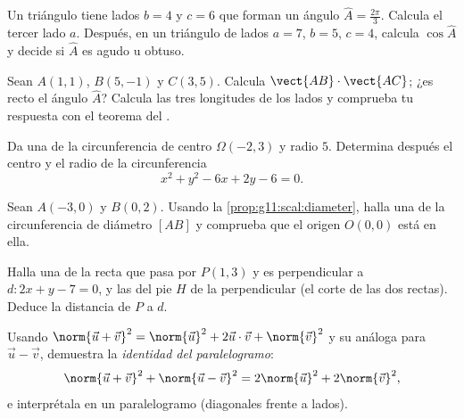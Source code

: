 \begin{exercise}[$\star\star$]\label{exo:g11:scal:5}
Un triángulo tiene lados $b = 4$ y $c = 6$ que forman un ángulo
$\widehat A = \frac{2\pi}{3}$. Calcula el tercer lado $a$. Después, en un
triángulo de lados $a = 7$, $b = 5$, $c = 4$, calcula $\cos\widehat A$ y
decide si $\widehat A$ es agudo u obtuso.
\end{exercise}

\begin{exercise}[$\star\star$]\label{exo:g11:scal:6}
Sean $A(1, 1)$, $B(5, -1)$ y $C(3, 5)$. Calcula
$\vect{AB} \cdot \vect{AC}$; ¿es recto el ángulo $\widehat A$? Calcula las
tres longitudes de los lados y comprueba tu respuesta con el teorema del
.
\end{exercise}

\begin{exercise}[$\star\star$]\label{exo:g11:scal:7}
Da una  de la circunferencia de centro $\Omega(-2, 3)$ y radio
$5$. Determina después el centro y el radio de la circunferencia
\[
x^2 + y^2 - 6x + 2y - 6 = 0 .
\]
\end{exercise}

\begin{exercise}[$\star\star$]\label{exo:g11:scal:8}
Sean $A(-3, 0)$ y $B(0, 2)$. Usando la \cref{prop:g11:scal:diameter},
halla una  de la circunferencia de diámetro $[AB]$ y comprueba que
el origen $O(0,0)$ está en ella.
\end{exercise}

\begin{exercise}[$\star\star$]\label{exo:g11:scal:9}
Halla una  de la recta que pasa por $P(1, 3)$ y es perpendicular a
$d : 2x + y - 7 = 0$, y las  del pie $H$ de la perpendicular
(el corte de las dos rectas). Deduce la distancia de $P$ a $d$.
\end{exercise}

\begin{exercise}[$\star\star$]\label{exo:g11:scal:10}
Usando $\norm{\vec u + \vec v}^2 = \norm{\vec u}^2 + 2\vec u\cdot\vec v +
\norm{\vec v}^2$ y su análoga para $\vec u - \vec v$, demuestra la
\emph{identidad del paralelogramo}:
\[
\norm{\vec u + \vec v}^2 + \norm{\vec u - \vec v}^2
= 2\norm{\vec u}^2 + 2\norm{\vec v}^2 ,
\]
e interprétala en un paralelogramo (diagonales frente a lados).
\end{exercise}

